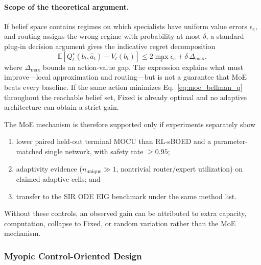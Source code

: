 \documentclass[11pt]{article}
\begin{document}
\paragraph{Scope of the theoretical argument.}
If belief space contains regimes on which specialists have uniform value
errors \(\epsilon_e\), and routing assigns the wrong regime with probability
at most \(\delta\), a standard plug-in decision argument gives the indicative
regret decomposition
\begin{equation}
\mathbb E[Q_t^\star(b_t,\widehat a_t)-V_t(b_t)]
\le 2\max_e\epsilon_e+\delta\,\Delta_{\max},
\label{eq:moe_regret_decomposition}
\end{equation}
where \(\Delta_{\max}\) bounds an action-value gap. The expression explains
what must improve---local approximation and routing---but is not a guarantee
that MoE beats every baseline. If the same action minimizes
Eq.~\eqref{eq:moe_bellman_q} throughout the reachable belief set, Fixed is
already optimal and no adaptive architecture can obtain a strict gain.

The MoE mechanism is therefore supported only if experiments separately show
\begin{enumerate}
    \item lower paired held-out terminal MOCU than RL-sBOED and a
    parameter-matched single network, with safety rate \(\ge0.95\);
    \item adaptivity evidence (\(n_{\mathrm{unique}}\gg 1\), nontrivial
    router/expert utilization) on claimed adaptive cells; and
    \item transfer to the SIR ODE EIG benchmark under the same method list.
\end{enumerate}
Without these controls, an observed gain can be attributed to extra capacity,
computation, collapse to Fixed, or random variation rather than the MoE
mechanism.

\subsubsection{Myopic Control-Oriented Design}
\end{document}
